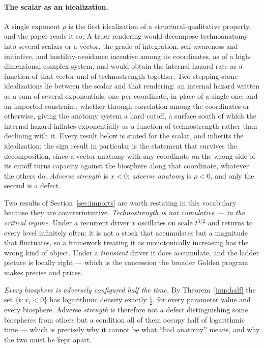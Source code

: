 \begin{definition}
\paragraph{The scalar as an idealization.} A single exponent $\rho$ is the first idealization of a structural-qualitative property, and the paper reads it so. A truer rendering would decompose technoanatomy into several scalars or a vector, the grade of integration, self-awareness and initiative, and hostility-avoidance incentive among its coordinates, as of a high-dimensional complex system, and would obtain the internal hazard rate as a function of that vector and of technostrength together. Two stepping-stone idealizations lie between the scalar and that rendering: an internal hazard written as a sum of several exponentials, one per coordinate, in place of a single one; and an imported constraint, whether through correlation among the coordinates or otherwise, giving the anatomy system a hard cutoff, a surface south of which the internal hazard inflates exponentially as a function of technostrength rather than declining with it. Every result below is stated for the scalar, and inherits the idealization; the sign result in particular is the statement that survives the decomposition, since a vector anatomy with any coordinate on the wrong side of its cutoff turns capacity against the biosphere along that coordinate, whatever the others do.
\emph{Adverse strength} is $x<0$; \emph{adverse anatomy} is $\rho<0$,
and only the second is a defect.
\end{definition}

Two results of Section~\ref{sec:imports} are worth restating in this vocabulary because
they are counterintuitive. \emph{Technostrength is not cumulative --- in the critical regime.}
Under a recurrent driver $x$ oscillates on scale $t^{3/2}$ and returns
to every level infinitely often: it is not a stock that accumulates but
a magnitude that fluctuates, so a framework treating it as monotonically
increasing has the wrong kind of object. Under a \emph{transient} driver
it does accumulate, and the ladder picture is locally right --- which is
the concession the broader Golden program makes precise and prices.

\emph{Every biosphere is adversely configured half the time.} By
Theorem~\ref{imp:half} the set $\{t:x_t<0\}$ has logarithmic density
exactly $\tfrac12$, for every parameter value and every biosphere.
Adverse \emph{strength} is therefore not a defect distinguishing some
biospheres from others but a condition all of them occupy half of
logarithmic time --- which is precisely why it cannot be what
``bad anatomy'' means, and why the two must be kept apart.

